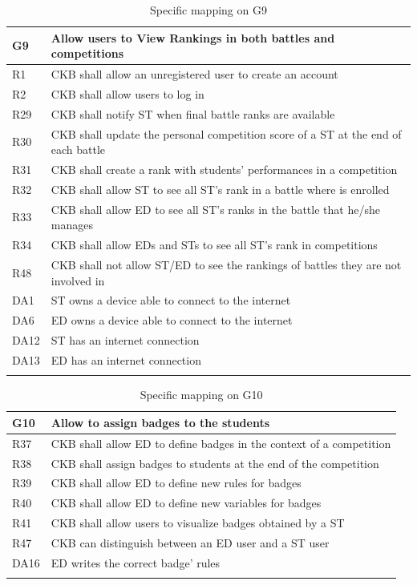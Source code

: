   \begin{longtable}{|l|p{12cm}|}
    \hline
    \textbf{G9} & \textbf{Allow users to View Rankings in both battles and competitions}      \\
    \hline
    R1 & CKB shall allow an unregistered user to create an account \\
    \hline
    R2 & CKB shall allow users to log in \\
    \hline
    R29 & CKB shall notify ST when final battle ranks are available \\
    \hline
    R30 & CKB shall update the personal competition score of a ST at the end of each battle \\
    \hline
    R31 & CKB shall create a rank with students' performances in a competition \\
    \hline
    R32 & CKB shall allow ST to see all ST’s rank in a battle where is enrolled \\
    \hline
    R33 & CKB shall allow ED to see all ST’s ranks in the battle that he/she manages \\
    \hline
    R34 & CKB shall allow EDs and STs to see all ST’s rank in competitions \\
    \hline
    R48 & CKB shall not allow ST/ED to see the rankings of battles they are not involved in \\
    \hline
    DA1 & ST owns a device able to connect to the internet \\
    \hline
    DA6 & ED owns a device able to connect to the internet \\
    \hline
    DA12 & ST has an internet connection \\
    \hline
    DA13 & ED has an internet connection \\ 
    \hline

    \caption{Specific mapping on G9}
    \label{tab:mappingG9}
  \end{longtable}

  \begin{longtable}{|l|p{12cm}|}
    \hline
    \textbf{G10} & \textbf{Allow to assign badges to the students}      \\
    \hline
    R37 & CKB shall allow ED to define badges in the context of a competition \\
    \hline
    R38 & CKB shall assign badges to students at the end of the competition \\
    \hline
    R39 & CKB shall allow ED to define new rules for badges \\
    \hline
    R40 & CKB shall allow ED to define new variables for badges \\
    \hline
    R41 & CKB shall allow users to visualize badges obtained by a ST \\
    \hline
    R47 & CKB can distinguish between an ED user and a ST user \\
    \hline
    DA16 & ED writes the correct badge’ rules \\
    \hline

    \caption{Specific mapping on G10}
    \label{tab:mappingG10}
  \end{longtable}

